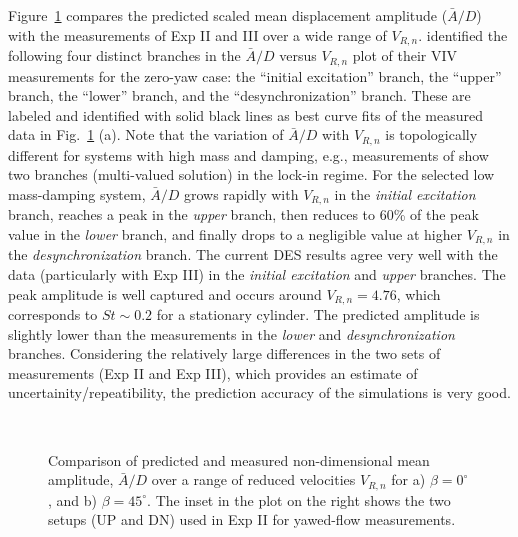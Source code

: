 Figure~\ref{fig:VIV_amp} compares the predicted scaled mean displacement
amplitude ($\bar{A}/D$) with the measurements of Exp II and III over a wide
range of $V_{R,n}$. \citet{khalak1997fluid} identified the following four
distinct branches in the $\bar{A}/D$ versus $V_{R,n}$ plot of their VIV
measurements for the zero-yaw case: the ``initial excitation'' branch, the
``upper'' branch, the ``lower'' branch, and the ``desynchronization'' branch.
These are labeled and identified with solid black lines as best curve fits of
the measured data in Fig.~\ref{fig:VIV_amp} (a). Note that the variation of
$\bar{A}/D$ with $V_{R,n}$ is topologically different for systems with high
mass and damping, e.g., measurements of \citet{feng1968measurement} show two
branches (multi-valued solution) in the lock-in regime. For the selected low
mass-damping system, $\bar{A}/D$ grows rapidly with $V_{R,n}$ in the {\em
initial excitation} branch, reaches a peak in the {\em upper} branch, then
reduces to 60\% of the peak value in the {\em lower} branch, and finally drops
to a negligible value at higher $V_{R,n}$ in the {\em desynchronization}
branch. The current DES results agree very well with the data (particularly
with Exp III) in the {\em initial excitation} and {\em upper} branches. The
peak amplitude is well captured and occurs around $V_{R,n}=4.76$, which
corresponds to $St\sim0.2$ for a stationary cylinder. The predicted amplitude
is slightly lower than the measurements in the {\em lower} and {\em
desynchronization} branches.  Considering the relatively large differences in
the two sets of measurements (Exp II and Exp III), which provides an estimate
of uncertainity/repeatibility, the prediction accuracy of the simulations is
very good.
%
\begin{figure}[htb!]
  \centering
   {}
  \qquad
   \\
    \caption{Comparison of predicted and measured non-dimensional mean
      amplitude, $\bar{A}/D$ over a range of reduced velocities $V_{R,n}$ for
      a) $\beta=0^\circ$, and b) $\beta=45^\circ$. The inset in the plot on the
      right shows the two setups (UP and DN) used in Exp II for yawed-flow
      measurements.} 
  \label{fig:VIV_amp}
\end{figure}

